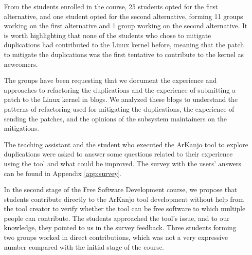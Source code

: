 From the students enrolled in the course, 25 students opted for the first alternative, and one 
student opted for the second alternative, forming 11 groups working on the first alternative 
and 1 group working on the second alternative. It is worth highlighting that none of the students 
who chose to mitigate duplications had contributed to the Linux kernel before, meaning that the 
patch to mitigate the duplications was the first tentative to contribute to the kernel as newcomers.

The groups have been requesting that we document the experience and approaches to refactoring the 
duplications and the experience of submitting a patch to the Linux kernel in blogs. We analyzed 
these blogs to understand the patterns of refactoring used for mitigating the duplications, the 
experience of sending the patches, and the opinions of the subsystem maintainers on the mitigations.

The teaching assistant and the student who executed the ArKanjo tool to explore duplications were 
asked to answer some questions related to their experience using the tool and what could be improved. 
The survey with the users' answers can be found in Appendix \ref{app:survey}.

In the second stage of the Free Software Development course, we propose that students contribute 
directly to the ArKanjo tool development without help from the tool creator to verify whether the 
tool can be free software to which multiple people can contribute. The students approached the tool’s 
issue, and to our knowledge, they pointed to us in the survey feedback. Three students forming two 
groups worked in direct contributions, which was not a very expressive number compared with the 
initial stage of the course.
